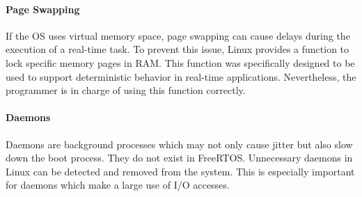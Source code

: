 \paragraph{Page Swapping}
If the \ac{OS} uses virtual memory space, page swapping can cause delays during the execution of a real-time task.
To prevent this issue, Linux provides a function to lock specific memory pages in \ac{RAM}.
This function was specifically designed to be used to support deterministic behavior in real-time applications.
Nevertheless, the programmer is in charge of using this function correctly.

\paragraph{Daemons}
Daemons are background processes which may not only cause jitter but also slow down the boot process. 
They do not exist in FreeRTOS.
Unnecessary daemons in Linux can be detected and removed from the system.
This is especially important for daemons which make a large use of \ac{I/O} accesses.

